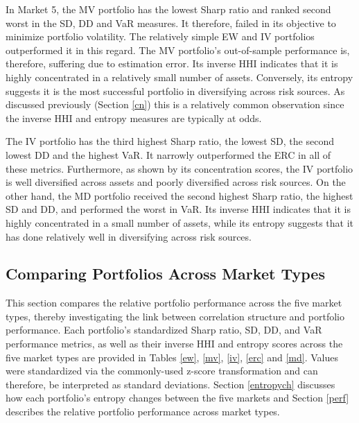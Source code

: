 \documentclass[11pt,preprint, authoryear]{elsarticle}
\numberwithin{equation}{section}
\numberwithin{figure}{section}
\numberwithin{table}{section}
\begin{document}
In Market 5, the MV portfolio has the lowest Sharp ratio and ranked
second worst in the SD, DD and VaR measures. It therefore, failed in its
objective to minimize portfolio volatility. The relatively simple EW and
IV portfolios outperformed it in this regard. The MV portfolio's
out-of-sample performance is, therefore, suffering due to estimation
error. Its inverse HHI indicates that it is highly concentrated in a
relatively small number of assets. Conversely, its entropy suggests it
is the most successful portfolio in diversifying across risk sources. As
discussed previously (Section \ref{cn}) this is a relatively common
observation since the inverse HHI and entropy measures are typically at
odds.

The IV portfolio has the third highest Sharp ratio, the lowest SD, the
second lowest DD and the highest VaR. It narrowly outperformed the ERC
in all of these metrics. Furthermore, as shown by its concentration
scores, the IV portfolio is well diversified across assets and poorly
diversified across risk sources. On the other hand, the MD portfolio
received the second highest Sharp ratio, the highest SD and DD, and
performed the worst in VaR. Its inverse HHI indicates that it is highly
concentrated in a small number of assets, while its entropy suggests
that it has done relatively well in diversifying across risk sources.

\hypertarget{comparing-portfolios-across-market-types}{%
\subsection{\texorpdfstring{Comparing Portfolios Across Market Types
\label {cross-market}}{Comparing Portfolios Across Market Types }}\label{comparing-portfolios-across-market-types}}

This section compares the relative portfolio performance across the five
market types, thereby investigating the link between correlation
structure and portfolio performance. Each portfolio's standardized Sharp
ratio, SD, DD, and VaR performance metrics, as well as their inverse HHI
and entropy scores across the five market types are provided in Tables
\ref{ew}, \ref{mv}, \ref{iv}, \ref{erc} and \ref{md}. Values were
standardized via the commonly-used z-score transformation and can
therefore, be interpreted as standard deviations. Section
\ref{entropych} discusses how each portfolio's entropy changes between
the five markets and Section \ref{perf} describes the relative portfolio
performance across market types.
\end{document}
